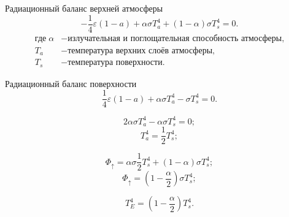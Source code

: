 Радиационный баланс верхней атмосферы
\begin{equation}
	-\frac{1}{4} \varepsilon (1 - a) + \alpha \sigma T_a^4 + (1-\alpha)\sigma T_s^4 = 0.
\end{equation}
\begin{align*}
	\text{где}\;  
	\alpha & - \text{излучательная и поглощательная способность атмосферы,}\\
	T_a & - \text{температура верхних слоёв атмосферы,}\\
	T_s & - \text{температура поверхности.}
\end{align*}


Радиационный баланс поверхности
\begin{equation}
	\frac{1}{4} \varepsilon (1 - a) + \alpha \sigma T_a^4 - \sigma T_s^4 = 0.
\end{equation}

$$2\alpha \sigma T_a^4 - \alpha \sigma T_s^4 = 0;$$
$$ T_a^4 =  \frac{1}{2} T_s^4;$$

$$\Phi_\uparrow = \alpha \sigma \frac{1}{2} T_s^4 + (1-\alpha)\sigma T_s^4;$$
$$\Phi_\uparrow =  ( 1-\frac{\alpha}{2})\sigma T_s^4;$$

\begin{equation}
	T_E^4 =  ( 1-\frac{\alpha}{2}) T_s^4.
\end{equation}
